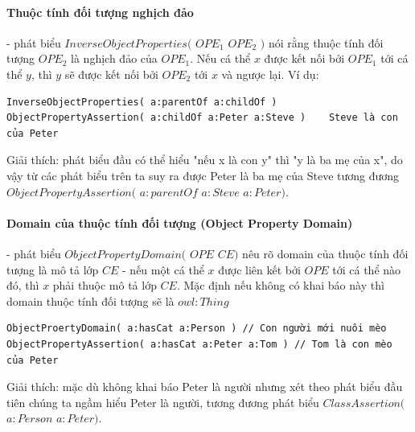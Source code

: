 \paragraph{Thuộc tính đối tượng nghịch đảo} - phát biểu $InverseObjectProperties($ $OPE_{1}$ $OPE_{2}$ $)$ nói rằng thuộc tính đối tượng $OPE_{2}$ là nghịch đảo của $OPE_{1}$. Nếu cá thể $x$ được kết nối bởi $OPE_{1}$ tới cá thể $y$, thì $y$ sẽ được kết nối bởi $OPE_{2}$ tới $x$ và ngược lại. Ví dụ:
\begin{verbatim}
InverseObjectProperties( a:parentOf a:childOf )
ObjectPropertyAssertion( a:childOf a:Peter a:Steve )	Steve là con của Peter
\end{verbatim}
Giải thích: phát biểu đầu có thể hiểu "nếu x là con y" thì "y là ba mẹ của x", do vậy từ các phát biểu trên ta suy ra được Peter là ba mẹ của Steve tương đương $ObjectPropertyAssertion($ $a:parentOf$ $a:Steve$ $a:Peter)$.

\paragraph{Domain của thuộc tính đối tượng (Object Property Domain)} - phát biểu $ObjectPropertyDomain($ $OPE$ $CE)$ nêu rõ domain của thuộc tính đối tượng là mô tả lớp $CE$ -  nếu một cá thể $x$ được liên kết bởi $OPE$ tới cá thể nào đó, thì $x$ phải thuộc mô tả lớp $CE$. Mặc định nếu không có khai báo này thì domain thuộc tính đối tượng sẽ là $owl:Thing$
\begin{verbatim}
ObjectProertyDomain( a:hasCat a:Person ) // Con người mới nuôi mèo
ObjectPropertyAssertion( a:hasCat a:Peter a:Tom ) // Tom là con mèo của Peter
\end{verbatim}
Giải thích: mặc dù không khai báo Peter là người nhưng xét theo phát biểu đầu tiên chúng ta ngầm hiểu Peter là người, tương đương phát biểu $ClassAssertion($ $a:Person$ $a:Peter)$.

